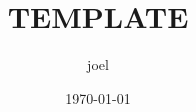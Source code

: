 \documentclass[10pt]{article}
\title{TEMPLATE}
\author{joel}
\date{\today}
\theoremstyle{definition}
\theoremstyle{remark}
\begin{document}
\maketitle

\section{}

\end{document}
